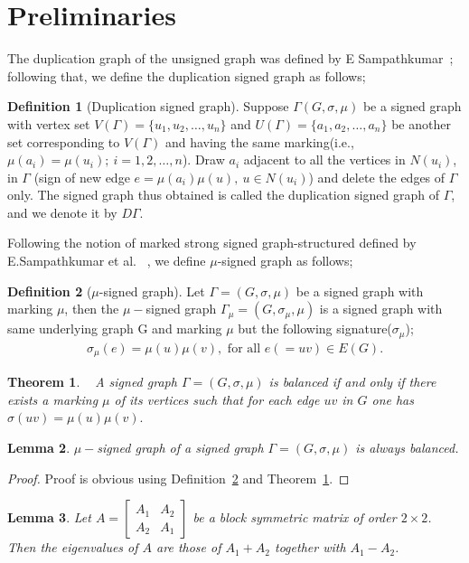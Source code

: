 \documentclass[12pt,a4paper]{article}
\newtheorem{theorem}{Theorem}[section]
\newtheorem{lemma}[theorem]{Lemma}
\theoremstyle{definition}
\newtheorem{definition}{Definition}[section]
\theoremstyle{remark}
\begin{document}
\section{\textbf{Preliminaries}}
    The duplication graph of the unsigned graph was defined by E Sampathkumar~\cite{sampathkumar1973duplicate}; following that, we define the duplication signed graph as follows;
    \begin{definition}[Duplication signed graph] \label{D0}
        Suppose $\Gamma(G,\sigma,\mu)$ be a signed graph with vertex set $V(\Gamma)=\{u_1,u_2,\ldots,u_n\}$ and $U(\Gamma)=\{a_1,a_2,\ldots,a_n\}$ be another set corresponding to $V(\Gamma)$ and having the same marking(i.e., $\mu(a_i)=\mu(u_i);~ i=1,2,\ldots,n$). Draw $a_i$ adjacent to all the vertices in $N(u_i)$, in $\Gamma$ (sign of new edge $e=\mu(a_i)\mu(u),~ u\in N(u_i)$) and delete the edges of $\Gamma$ only. The signed graph thus obtained is called the duplication signed graph of $\Gamma$, and we denote it by $D\Gamma$.
    \end{definition}

    Following the notion of marked strong signed graph-structured defined by E.Sampathkumar et al. ~\cite{article}, we define $\mu$-signed graph as follows;
    \begin{definition}[$\mu$-signed graph] \label{D5}
        Let $\Gamma=(G,\sigma,\mu)$ be a signed graph with marking $\mu$, then the $\mu-$signed graph $\Gamma_{\mu}=(G,\sigma_{\mu},\mu)$ is a signed graph with same underlying graph G and marking $\mu$ but the following signature($\sigma_{\mu}$);
        \begin{align*}
            \sigma_{\mu}(e)=\mu(u)\mu(v), \text{ for all } e(=uv)\in E(G).
        \end{align*}
    \end{definition}

    \begin{theorem}~\cite{harary1953notion} \label{Th1}
        A signed graph $\Gamma=(G,\sigma,\mu)$ is balanced if and only if there exists a marking $\mu$ of its vertices such that for each edge $uv$ in $G$ one has $\sigma(uv)=\mu(u)\mu(v).$
    \end{theorem}

   \begin{lemma}
       $\mu-$signed graph of a signed graph $\Gamma=(G,\sigma,\mu)$ is always balanced.
   \end{lemma}

   \begin{proof}
       Proof is obvious using Definition~\ref{D5} and Theorem~\ref{Th1}.
   \end{proof}
   \begin{lemma}\label{L1}\cite{cvetkovic1980spectra}
        Let $A=\begin{bmatrix}
            A_1&A_2\\A_2&A_1
        \end{bmatrix}$
        be a block symmetric matrix of order $2\times2$. Then the eigenvalues of $A$ are those of $A_1+A_2$ together with $A_1-A_2$.
    \end{lemma}
\end{document}
